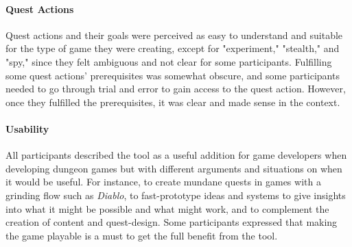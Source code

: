 



\paragraph{Quest Actions}

Quest actions and their goals were perceived as easy to understand and suitable for the type of game they were creating, except for "experiment," "stealth," and "spy," since they felt ambiguous and not clear for some participants. Fulfilling some quest actions' prerequisites was somewhat obscure, and some participants needed to go through trial and error to gain access to the quest action. However, once they fulfilled the prerequisites, it was clear and made sense in the context.

\paragraph{Usability}

All participants described the tool as a useful addition for game developers when developing dungeon games but with different arguments and situations on when it would be useful. For instance, to create mundane quests in games with a grinding flow such as \emph{Diablo}, to fast-prototype ideas and systems to give insights into what it might be possible and what might work, and to complement the creation of content and quest-design. Some participants expressed that making the game playable is a must to get the full benefit from the tool.

